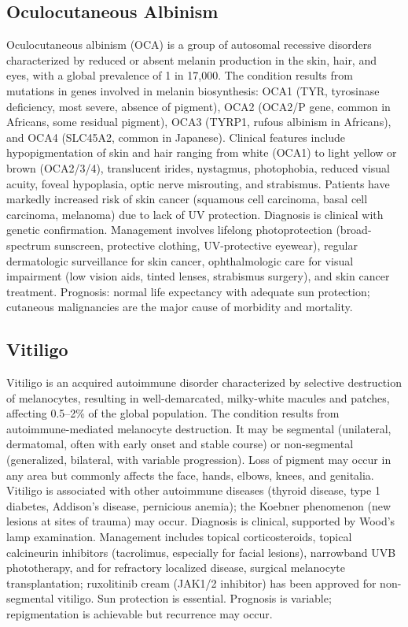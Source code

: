 \subsection{Oculocutaneous Albinism}
\label{sec:Oculocutaneous Albinism}
Oculocutaneous albinism (OCA) is a group of autosomal recessive disorders characterized by reduced or absent melanin production in the skin, hair, and eyes, with a global prevalence of 1 in 17,000. The condition results from mutations in genes involved in melanin biosynthesis: OCA1 (TYR, tyrosinase deficiency, most severe, absence of pigment), OCA2 (OCA2/P gene, common in Africans, some residual pigment), OCA3 (TYRP1, rufous albinism in Africans), and OCA4 (SLC45A2, common in Japanese). Clinical features include hypopigmentation of skin and hair ranging from white (OCA1) to light yellow or brown (OCA2/3/4), translucent irides, nystagmus, photophobia, reduced visual acuity, foveal hypoplasia, optic nerve misrouting, and strabismus. Patients have markedly increased risk of skin cancer (squamous cell carcinoma, basal cell carcinoma, melanoma) due to lack of UV protection. Diagnosis is clinical with genetic confirmation. Management involves lifelong photoprotection (broad-spectrum sunscreen, protective clothing, UV-protective eyewear), regular dermatologic surveillance for skin cancer, ophthalmologic care for visual impairment (low vision aids, tinted lenses, strabismus surgery), and skin cancer treatment. Prognosis: normal life expectancy with adequate sun protection; cutaneous malignancies are the major cause of morbidity and mortality.

\subsection{Vitiligo}
\label{sec:Vitiligo}
Vitiligo is an acquired autoimmune disorder characterized by selective destruction of melanocytes, resulting in well-demarcated, milky-white macules and patches, affecting 0.5--2\% of the global population. The condition results from autoimmune-mediated melanocyte destruction. It may be segmental (unilateral, dermatomal, often with early onset and stable course) or non-segmental (generalized, bilateral, with variable progression). Loss of pigment may occur in any area but commonly affects the face, hands, elbows, knees, and genitalia. Vitiligo is associated with other autoimmune diseases (thyroid disease, type 1 diabetes, Addison's disease, pernicious anemia); the Koebner phenomenon (new lesions at sites of trauma) may occur. Diagnosis is clinical, supported by Wood's lamp examination. Management includes topical corticosteroids, topical calcineurin inhibitors (tacrolimus, especially for facial lesions), narrowband UVB phototherapy, and for refractory localized disease, surgical melanocyte transplantation; ruxolitinib cream (JAK1/2 inhibitor) has been approved for non-segmental vitiligo. Sun protection is essential. Prognosis is variable; repigmentation is achievable but recurrence may occur.

